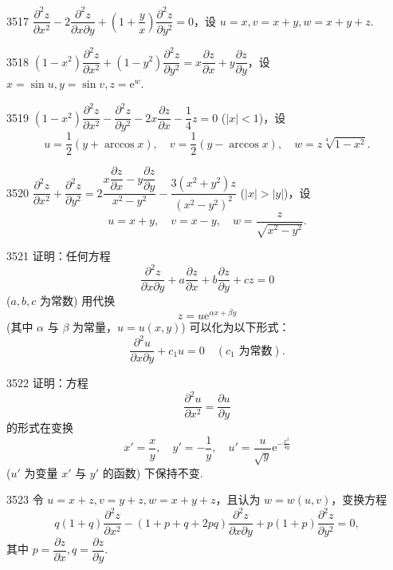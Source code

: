 \begin{prob}[S]{3517}
$\dfrac{\partial^2 z}{\partial x^2} - 2\dfrac{\partial^2 z}{\partial x\partial y} + \left(1 + \dfrac{y}{x}\right)\dfrac{\partial^2 z}{\partial y^2} = 0$，设 $u = x, v = x + y, w = x + y + z$.
\end{prob}

\begin{prob}[S]{3518}
$(1 - x^2)\dfrac{\partial^2 z}{\partial x^2} + (1 - y^2)\dfrac{\partial^2 z}{\partial y^2} = x\dfrac{\partial z}{\partial x} + y\dfrac{\partial z}{\partial y}$，设 $x = \sin u, y = \sin v, z = \mathrm{e}^w$.
\end{prob}

\begin{prob}[M]{3519}
$(1 - x^2)\dfrac{\partial^2 z}{\partial x^2} - \dfrac{\partial^2 z}{\partial y^2} - 2x\dfrac{\partial z}{\partial x} - \dfrac{1}{4}z = 0$ ($|x| < 1$)，设
\[
u = \frac{1}{2}(y + \arccos x), \quad v = \frac{1}{2}(y - \arccos x), \quad w = z\sqrt[4]{1 - x^2}.
\]
\end{prob}

\begin{prob}[M]{3520}
$\dfrac{\partial^2 z}{\partial x^2} + \dfrac{\partial^2 z}{\partial y^2} = 2\dfrac{x\dfrac{\partial z}{\partial x} - y\dfrac{\partial z}{\partial y}}{x^2 - y^2} - \dfrac{3(x^2 + y^2)z}{(x^2 - y^2)^2}$ ($|x| > |y|$)，设
\[
u = x + y, \quad v = x - y, \quad w = \frac{z}{\sqrt{x^2 - y^2}}.
\]
\end{prob}

\begin{prob}[M]{3521}
证明：任何方程
\[
\frac{\partial^2 z}{\partial x\partial y} + a\frac{\partial z}{\partial x} + b\frac{\partial z}{\partial y} + cz = 0
\]
($a, b, c$ 为常数) 用代换
\[
z = u\mathrm{e}^{\alpha x + \beta y}
\]
(其中 $\alpha$ 与 $\beta$ 为常量，$u = u(x, y)$) 可以化为以下形式：
\[
\frac{\partial^2 u}{\partial x\partial y} + c_1 u = 0 \quad (c_1 \text{ 为常数}).
\]
\end{prob}

\begin{prob}[M]{3522}
证明：方程
\[
\frac{\partial^2 u}{\partial x^2} = \frac{\partial u}{\partial y}
\]
的形式在变换
\[
x' = \frac{x}{y}, \quad y' = -\frac{1}{y}, \quad u' = \frac{u}{\sqrt{y}}\mathrm{e}^{-\frac{x^2}{4y}}
\]
($u'$ 为变量 $x'$ 与 $y'$ 的函数) 下保持不变.
\end{prob}

\begin{prob}[M]{3523}
令 $u = x + z, v = y + z, w = x + y + z$，且认为 $w = w(u, v)$，变换方程
\[
q(1 + q)\frac{\partial^2 z}{\partial x^2} - (1 + p + q + 2pq)\frac{\partial^2 z}{\partial x\partial y} + p(1 + p)\frac{\partial^2 z}{\partial y^2} = 0,
\]
其中 $p = \dfrac{\partial z}{\partial x}, q = \dfrac{\partial z}{\partial y}$.
\end{prob}

